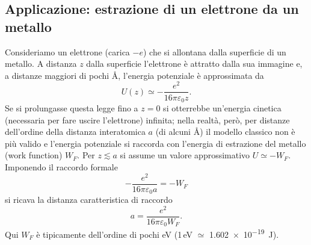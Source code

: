 \documentclass{book}
\begin{document}
\subsection{Applicazione: estrazione di un elettrone da un metallo}

Consideriamo un elettrone (carica $-e$) che si allontana dalla superficie di un metallo. A distanza $z$ dalla superficie l'elettrone è attratto dalla sua immagine e, a distanze maggiori di pochi \AA, l'energia potenziale è approssimata da
\[
U(z)\simeq -\frac{e^{2}}{16\pi\varepsilon_0 z}.
\]
Se si prolungasse questa legge fino a $z=0$ si otterrebbe un'energia cinetica (necessaria per fare uscire l'elettrone) infinita; nella realtà, però, per distanze dell'ordine della distanza interatomica $a$ (di alcuni \AA) il modello classico non è più valido e l'energia potenziale si raccorda con l'energia di estrazione del metallo (work function) $W_F$. Per $z\lesssim a$ si assume un valore approssimativo $U\simeq -W_F$. Imponendo il raccordo formale
\[
-\frac{e^{2}}{16\pi\varepsilon_0 a} = -W_F
\]
si ricava la distanza caratteristica di raccordo
\[
a = \frac{e^{2}}{16\pi\varepsilon_0 W_F}.
\]
Qui $W_F$ è tipicamente dell'ordine di pochi eV (1\,eV \(\simeq\) \SI{1.602e-19}{J}).
\end{document}
